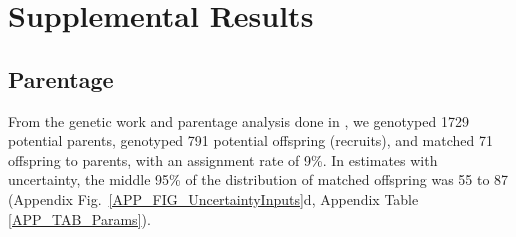 \documentclass[12pt, oneside]{article}   	%
\begin{document}




\newpage{}

\section{Supplemental Results} \label{APP_SEC_RESULTS} %

\subsection{Parentage} \label{APP_SEC_RESULTS_Parentage}

From the genetic work and parentage analysis done in \cite{catalanoInPrepconnectivity}, we genotyped 1729 potential parents, genotyped 791 potential offspring (recruits), and matched 71 offspring to parents, with an assignment rate of 9\%. In estimates with uncertainty, the middle 95\% of the distribution of matched offspring was 55 to 87 (Appendix Fig.\ \ref{APP_FIG_UncertaintyInputs}d, Appendix Table \ref{APP_TAB_Params}).
\end{document}
